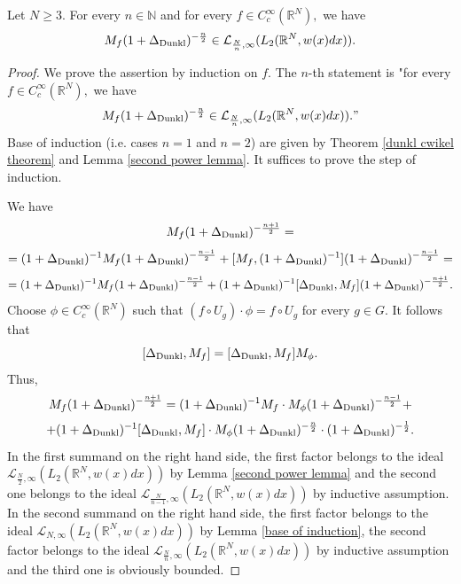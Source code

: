 \documentclass{amsart}
\begin{document}
\begin{lemma}\label{higher power lemma} Let $N\geq3.$ For every $n\in\mathbb{N}$ and for every $f\in C^{\infty}_c(\mathbb{R}^N),$ we have
$$M_f(1+\Delta_{{\rm Dunkl}})^{-\frac{n}{2}}\in \mathcal{L}_{\frac{N}{n},\infty}(L_2(\mathbb{R}^N,w(x)dx)).$$
\end{lemma}
\begin{proof} We prove the assertion by induction on $f.$ The $n$-th statement is "for every $f\in C^{\infty}_c(\mathbb{R}^N),$ we have
$$M_f(1+\Delta_{{\rm Dunkl}})^{-\frac{n}{2}}\in \mathcal{L}_{\frac{N}{n},\infty}(L_2(\mathbb{R}^N,w(x)dx))."$$
Base of induction (i.e. cases $n=1$ and $n=2$) are given by Theorem \ref{dunkl cwikel theorem} and Lemma \ref{second power lemma}. It suffices to prove the step of induction.

We have
$$M_f(1+\Delta_{{\rm Dunkl}})^{-\frac{n+1}{2}}=$$
$$=(1+\Delta_{{\rm Dunkl}})^{-1}M_f(1+\Delta_{{\rm Dunkl}})^{-\frac{n-1}{2}}+[M_f,(1+\Delta_{{\rm Dunkl}})^{-1}](1+\Delta_{{\rm Dunkl}})^{-\frac{n-1}{2}}=$$
$$=(1+\Delta_{{\rm Dunkl}})^{-1}M_f(1+\Delta_{{\rm Dunkl}})^{-\frac{n-1}{2}}+(1+\Delta_{{\rm Dunkl}})^{-1}[\Delta_{{\rm Dunkl}},M_f](1+\Delta_{{\rm Dunkl}})^{-\frac{n+1}{2}}.$$
Choose $\phi\in C^{\infty}_c(\mathbb{R}^N)$ such that $(f\circ U_g)\cdot\phi=f\circ U_g$ for every $g\in G.$ It follows that
$$[\Delta_{{\rm Dunkl}},M_f]=[\Delta_{{\rm Dunkl}},M_f]M_{\phi}.$$
Thus,
$$M_f(1+\Delta_{{\rm Dunkl}})^{-\frac{n+1}{2}}=(1+\Delta_{{\rm Dunkl}})^{-1}M_f\cdot M_{\phi}(1+\Delta_{{\rm Dunkl}})^{-\frac{n-1}{2}}+$$
$$+(1+\Delta_{{\rm Dunkl}})^{-1}[\Delta_{{\rm Dunkl}},M_f]\cdot M_{\phi}(1+\Delta_{{\rm Dunkl}})^{-\frac{n}{2}}\cdot (1+\Delta_{{\rm Dunkl}})^{-\frac12}.$$
In the first summand on the right hand side, the first factor belongs to the ideal $\mathcal{L}_{\frac{N}{2},\infty}(L_2(\mathbb{R}^N,w(x)dx))$ by Lemma \ref{second power lemma} and the second one belongs to the ideal $\mathcal{L}_{\frac{N}{n-1},\infty}(L_2(\mathbb{R}^N,w(x)dx))$ by inductive assumption. In the second summand on the right hand side, the first factor belongs to the ideal $\mathcal{L}_{N,\infty}(L_2(\mathbb{R}^N,w(x)dx))$ by Lemma \ref{base of induction}, the second factor belongs to the ideal $\mathcal{L}_{\frac{N}{n},\infty}(L_2(\mathbb{R}^N,w(x)dx))$ by inductive assumption and the third one is obviously bounded.
\end{proof}
\end{document}
